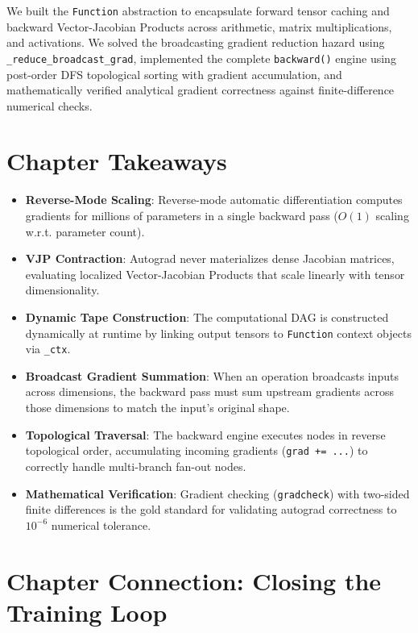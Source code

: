 \documentclass[
  letterpaper,
]{scrbook}
\providecommand{\tightlist}{%
  \setlength{\itemsep}{0pt}\setlength{\parskip}{0pt}}
\begin{document}
We built the \texttt{Function} abstraction to encapsulate forward tensor
caching and backward Vector-Jacobian Products across arithmetic, matrix
multiplications, and activations. We solved the broadcasting gradient
reduction hazard using \texttt{\_reduce\_broadcast\_grad}, implemented
the complete \texttt{backward()} engine using post-order DFS topological
sorting with gradient accumulation, and mathematically verified
analytical gradient correctness against finite-difference numerical
checks.

\section{Chapter Takeaways}\label{chapter-takeaways-6}

\begin{itemize}
\tightlist
\item
  \textbf{Reverse-Mode Scaling}: Reverse-mode automatic differentiation
  computes gradients for millions of parameters in a single backward
  pass (\(O(1)\) scaling w.r.t. parameter count).
\item
  \textbf{VJP Contraction}: Autograd never materializes dense Jacobian
  matrices, evaluating localized Vector-Jacobian Products that scale
  linearly with tensor dimensionality.
\item
  \textbf{Dynamic Tape Construction}: The computational DAG is
  constructed dynamically at runtime by linking output tensors to
  \texttt{Function} context objects via \texttt{\_ctx}.
\item
  \textbf{Broadcast Gradient Summation}: When an operation broadcasts
  inputs across dimensions, the backward pass must sum upstream
  gradients across those dimensions to match the input's original shape.
\item
  \textbf{Topological Traversal}: The backward engine executes nodes in
  reverse topological order, accumulating incoming gradients
  (\texttt{grad\ +=\ ...}) to correctly handle multi-branch fan-out
  nodes.
\item
  \textbf{Mathematical Verification}: Gradient checking
  (\texttt{gradcheck}) with two-sided finite differences is the gold
  standard for validating autograd correctness to \(10^{-6}\) numerical
  tolerance.
\end{itemize}

\section{Chapter Connection: Closing the Training
Loop}\label{chapter-connection-closing-the-training-loop}
\end{document}
